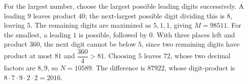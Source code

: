 For the largest number, choose the largest possible leading digits successively. A leading $9$ leaves product $40$; the next-largest possible digit dividing this is $8$, leaving $5$. The remaining digits are maximized as $5,1,1$, giving $M=98511$. For the smallest, a leading $1$ is possible, followed by $0$. With three places left and product $360$, the next digit cannot be below $5$, since two remaining digits have product at most $81$ and $\dfrac{360}{4}>81$. Choosing $5$ leaves $72$, whose two decimal factors are $8,9$, so $N=10589$. The difference is $87922$, whose digit-product is $8\cdot7\cdot9\cdot2\cdot2=\boxed{2016}$.
